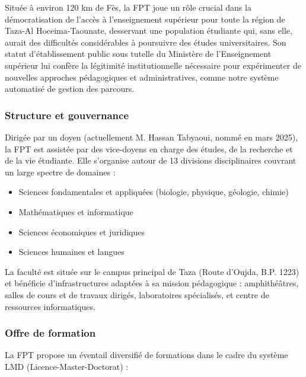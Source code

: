 \documentclass[french,12pt]{report} %
\begin{document}
Située à environ 120 km de Fès, la FPT joue un rôle crucial dans la démocratisation de l'accès à l'enseignement supérieur pour toute la région de Taza-Al Hoceima-Taounate, desservant une population étudiante qui, sans elle, aurait des difficultés considérables à poursuivre des études universitaires. Son statut d'établissement public sous tutelle du Ministère de l'Enseignement supérieur lui confère la légitimité institutionnelle nécessaire pour expérimenter de nouvelles approches pédagogiques et administratives, comme notre système automatisé de gestion des parcours.

\subsubsection{Structure et gouvernance}

Dirigée par un doyen (actuellement M. Hassan Tabyaoui, nommé en mars 2025), la FPT est assistée par des vice-doyens en charge des études, de la recherche et de la vie étudiante. Elle s'organise autour de 13 divisions disciplinaires couvrant un large spectre de domaines :

\begin{itemize}
    \item Sciences fondamentales et appliquées (biologie, physique, géologie, chimie)
    \item Mathématiques et informatique
    \item Sciences économiques et juridiques
    \item Sciences humaines et langues
\end{itemize}

La faculté est située sur le campus principal de Taza (Route d'Oujda, B.P. 1223) et bénéficie d'infrastructures adaptées à sa mission pédagogique : amphithéâtres, salles de cours et de travaux dirigés, laboratoires spécialisés, et centre de ressources informatiques.

\subsubsection{Offre de formation}

La FPT propose un éventail diversifié de formations dans le cadre du système LMD (Licence-Master-Doctorat) :
\end{document}
